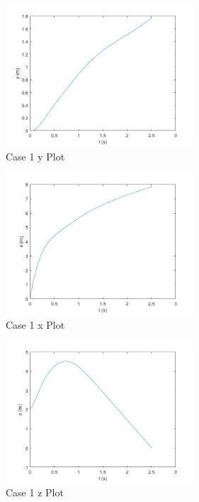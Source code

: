 \documentclass[12pt,twoside,letterpaper]{article}
\begin{document}
\begin{multicols}{3}

\begin{figure}[H]
\centering
\includegraphics[width=7cm]{figures/case_1_y.jpg}
\caption{Case 1 y Plot}
\label{Case 1 y Plot}

\end{figure}
\begin{figure}[H]
\centering
\includegraphics[width=7cm]{figures/case_1_x.jpg}
\caption{Case 1 x Plot}
\label{Case 1 x Plot}
\end{figure}
\begin{figure}[H]
\centering
\includegraphics[width=7cm]{figures/case_1_z.jpg}
\caption{Case 1 z Plot}
\label{Case 1 z Plot}
\end{figure}

\end{multicols}
\newpage
\end{document}
